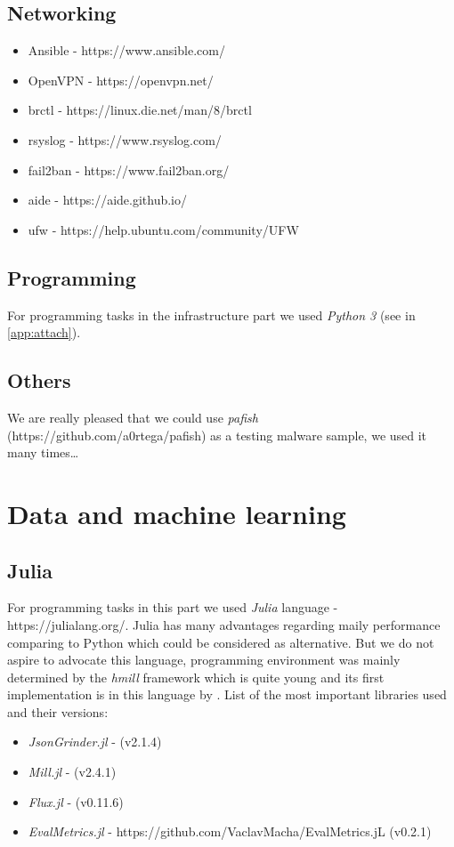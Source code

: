 \subsection*{Networking}
\begin{itemize}
  \itemsep0em 
  \item Ansible - https://www.ansible.com/
  \item OpenVPN - https://openvpn.net/
  \item brctl - https://linux.die.net/man/8/brctl
  \item rsyslog - https://www.rsyslog.com/
  \item fail2ban - https://www.fail2ban.org/
  \item aide - https://aide.github.io/
  \item ufw - https://help.ubuntu.com/community/UFW
\end{itemize}

\subsection*{Programming}
For programming tasks in the infrastructure part we used \emph{Python 3} (see in \ref{app:attach}).
\subsection*{Others}
We are really pleased that we could use \emph{pafish} (https://github.com/a0rtega/pafish) as a testing malware sample, we used it many times\dots

\section*{Data and machine learning}
\subsection*{Julia}
For programming tasks in this part we used \emph{Julia} language - https://julialang.org/. Julia has many advantages regarding maily performance comparing to Python which could be considered as alternative. But we do not aspire to advocate this language, programming environment was mainly determined by the \emph{hmill} framework which is quite young and its first implementation is in this language by \cite{Mandlik2020}. List of the most important libraries used and their versions:
\begin{itemize}
  \itemsep0em 
  \item \emph{JsonGrinder.jl} - \cite{Pevny2019} (v2.1.4)
  \item \emph{Mill.jl} - \cite{Pevny2018} (v2.4.1)
  \item \emph{Flux.jl} - \cite{Innes2018a, Innes2018} (v0.11.6)
  \item \emph{EvalMetrics.jl} - https://github.com/VaclavMacha/EvalMetrics.jL (v0.2.1)
\end{itemize}
